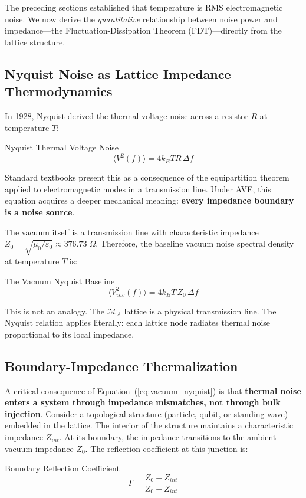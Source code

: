 The preceding sections established that temperature is RMS electromagnetic noise. We now derive the \textit{quantitative} relationship between noise power and impedance---the Fluctuation-Dissipation Theorem (FDT)---directly from the lattice structure.

\subsection{Nyquist Noise as Lattice Impedance Thermodynamics}

In 1928, Nyquist derived the thermal voltage noise across a resistor $R$ at temperature $T$:
\begin{resultbox}{Nyquist Thermal Voltage Noise}
\begin{equation}
    \langle V^2(f) \rangle = 4 k_B T R \, \Delta f
    \label{eq:nyquist}
\end{equation}
\end{resultbox}
Standard textbooks present this as a consequence of the equipartition theorem applied to electromagnetic modes in a transmission line. Under AVE, this equation acquires a deeper mechanical meaning: \textbf{every impedance boundary is a noise source}.

The vacuum itself is a transmission line with characteristic impedance $Z_0 = \sqrt{\mu_0 / \varepsilon_0} \approx 376.73 \;\Omega$. Therefore, the baseline vacuum noise spectral density at temperature $T$ is:
\begin{resultbox}{The Vacuum Nyquist Baseline}
\begin{equation}
    \langle V^2_{vac}(f) \rangle = 4 k_B T \, Z_0 \, \Delta f
    \label{eq:vacuum_nyquist}
\end{equation}
\end{resultbox}
This is not an analogy. The $\mathcal{M}_A$ lattice is a physical transmission line. The Nyquist relation applies literally: each lattice node radiates thermal noise proportional to its local impedance.

\subsection{Boundary-Impedance Thermalization}

A critical consequence of Equation~(\ref{eq:vacuum_nyquist}) is that \textbf{thermal noise enters a system through impedance mismatches, not through bulk injection}. Consider a topological structure (particle, qubit, or standing wave) embedded in the lattice. The interior of the structure maintains a characteristic impedance $Z_{int}$. At its boundary, the impedance transitions to the ambient vacuum impedance $Z_0$. The reflection coefficient at this junction is:
\begin{resultbox}{Boundary Reflection Coefficient}
\begin{equation}
    \Gamma = \frac{Z_0 - Z_{int}}{Z_0 + Z_{int}}
    \label{eq:reflection_coefficient}
\end{equation}
\end{resultbox}

